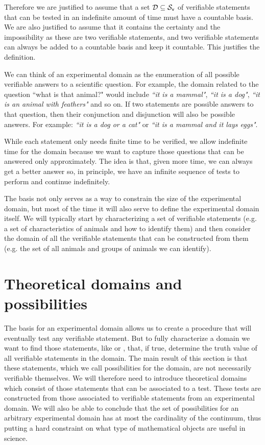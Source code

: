 \begin{mathSection}
\begin{justification}
			Therefore we are justified to assume that a set $\mathcal{D} \subseteq \mathcal{S}_\textsf{v}$ of verifiable statements that can be tested in an indefinite amount of time must have a countable basis. We are also justified to assume that it contains the certainty and the impossibility as these are two verifiable statements, and two verifiable statements can always be added to a countable basis and keep it countable. This justifies the definition.
		\end{justification}
	\end{mathSection}
	
	We can think of an experimental domain as the enumeration of all possible verifiable answers to a scientific question. For example, the domain related to the question ``what is that animal?" would include \emph{``it is a mammal"}, \emph{``it is a dog"}, \emph{``it is an animal with feathers"} and so on. If two statements are possible answers to that question, then their conjunction and disjunction will also be possible answers. For example: \emph{``it is a dog or a cat"} or \emph{``it is a mammal and it lays eggs"}.
	
	While each statement only needs finite time to be verified, we allow indefinite time for the domain because we want to capture those questions that can be answered only approximately. The idea is that, given more time, we can always get a better answer so, in principle, we have an infinite sequence of tests to perform and continue indefinitely.
	
	The basis not only serves as a way to constrain the size of the experimental domain, but most of the time it will also serve to define the experimental domain itself. We will typically start by characterizing a set of verifiable statements (e.g. a set of characteristics of animals and how to identify them) and then consider the domain of all the verifiable statements that can be constructed from them (e.g. the set of all animals and groups of animals we can identify).
	
	\section{Theoretical domains and possibilities}
	
	The basis for an experimental domain allows us to create a procedure that will eventually test any verifiable statement. But to fully characterize a domain we want to find those statements, like  or , that, if true, determine the truth value of all verifiable statements in the domain. The main result of this section is that these statements, which we call possibilities for the domain, are not necessarily verifiable themselves. We will therefore need to introduce theoretical domains which consist of those statements that can be associated to a test. These tests are constructed from those associated to verifiable statements from an experimental domain. We will also be able to conclude that the set of possibilities for an arbitrary experimental domain has at most the cardinality of the continuum, thus putting a hard constraint on what type of mathematical objects are useful in science.
	
